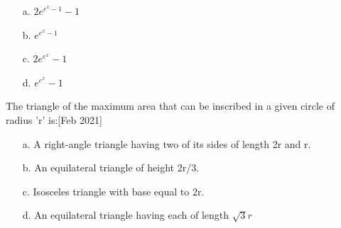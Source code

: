 \begin{multicols}{2}
\begin{enumerate}
    \item [a.] $2e^{e^x-1}-1$
    \item [b.] $e^{e^x-1}$
	    \columnbreak
    \item [c.] $2e^{e^x}-1$
    \item [d.] $e^{e^x}-1$
\end{enumerate}
\end{multicols}
\item The triangle of the maximum area that can be inscribed in a given circle of radius 'r' is:\hfill [Feb 2021]
\begin{enumerate}
    \item [a.] A right-angle triangle having two of its sides of length 2r and r.
    \item [b.] An equilateral triangle of height 2r/3.
    \item [c.] Isosceles triangle with base equal to 2r.
    \item [d.] An equilateral triangle having each of length $\sqrt{3}r$
\end{enumerate}

